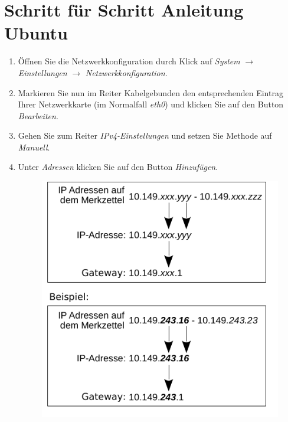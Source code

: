 \documentclass[a4paper,12pt]{scrartcl}
\begin{document}
\section*{Schritt für Schritt Anleitung Ubuntu}

\begin{enumerate}
	\item Öffnen Sie die Netzwerkkonfiguration durch Klick auf \emph{System} $\rightarrow$ \emph{Einstellungen} $\rightarrow$ \emph{Netzwerkkonfiguration}.
	\item Markieren Sie nun im Reiter Kabelgebunden den entsprechenden Eintrag Ihrer Netzwerkkarte (im Normalfall \emph{eth0}) und klicken Sie auf den Button \emph{Bearbeiten}.
	\item Gehen Sie zum Reiter \emph{IPv4-Einstellungen} und setzen Sie Methode auf \emph{Manuell}.
	\item Unter \emph{Adressen} klicken Sie auf den Button \emph{Hinzufügen}.
	\begin{figure}[h!]
		\centering
		\begin{minipage}[c]{0.45\linewidth}
			\centering
			\includegraphics[width=\linewidth,keepaspectratio]{Bilder/IP_Gerneric_mb}
		\end{minipage}
		\begin{minipage}[c]{0.5\linewidth}
			\centering

\end{minipage}
\end{figure}
\end{enumerate}
\end{document}
